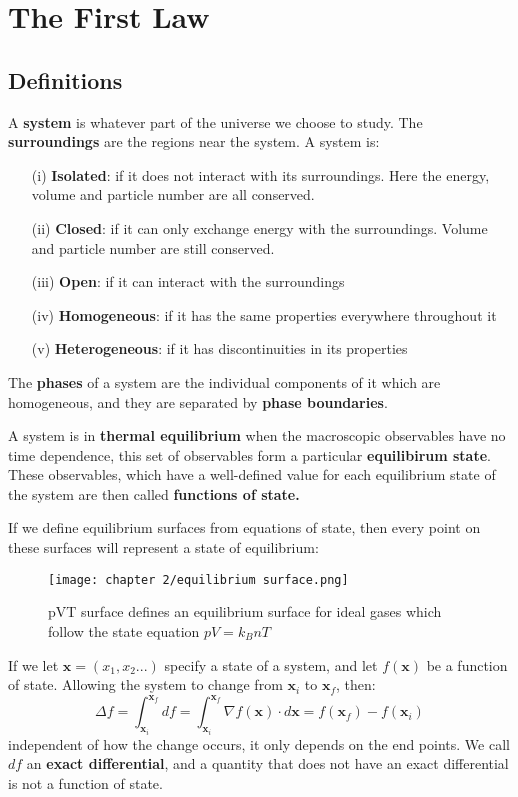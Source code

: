 \documentclass[a4paper,11pt,oneside]{book}
\begin{document}
\chapter{The First Law}
\section{Definitions}
A \textbf{system} is whatever part of the universe we choose to study. The \textbf{surroundings} are the regions near the system. 
A system is:
\begin{enumerate}
    \item[(i)] \textbf{Isolated}: if it does not interact with its surroundings. Here the energy, volume and particle number are all conserved.
    \item[(ii)] \textbf{Closed}: if it can only exchange energy with the surroundings. Volume and particle number are still conserved. 
    \item[(iii)] \textbf{Open}: if it can interact with the surroundings
    \item[(iv)] \textbf{Homogeneous}: if it has the same properties everywhere throughout it
    \item[(v)] \textbf{Heterogeneous}: if it has discontinuities in its properties
\end{enumerate}
The \textbf{phases} of a system are the individual components of it which are homogeneous, and they are separated by \textbf{phase boundaries}. 



A system is in \textbf{thermal equilibrium} when the macroscopic observables have no time dependence, this set of observables form a particular \textbf{equilibirum state}. These observables, which have a well-defined value for each equilibrium state of the system are then called \textbf{functions of state.}

If we define equilibrium surfaces from equations of state, then every point on these surfaces will represent a state of equilibrium:
\begin{figure}[h!]
    \centering
    \texttt{[image: chapter 2/equilibrium surface.png]}
    \caption{pVT surface defines an equilibrium surface for ideal gases which follow the state equation $pV = k_BnT$}
    \label{fig:my_label}
\end{figure}
If we let $\textbf{x}=(x_1,x_2...)$ specify a state of a system, and let $f(\textbf{x})$ be a function of state. Allowing the system to change from $\textbf{x}_i$ to $\textbf{x}_f$, then:
\begin{equation}
    \Delta f = \int_{\textbf{x}_i}^{\textbf{x}_f} df =\int_{\textbf{x}_i}^{\textbf{x}_f} \nabla f(\textbf{x}) \cdot d\textbf{x}= f(\textbf{x}_f)-f(\textbf{x}_i)
\end{equation}
independent of how the change occurs, it only depends on the end points. We call $df$ an \textbf{exact differential}, and a quantity that does not have an exact differential is not a function of state. 
\end{document}
